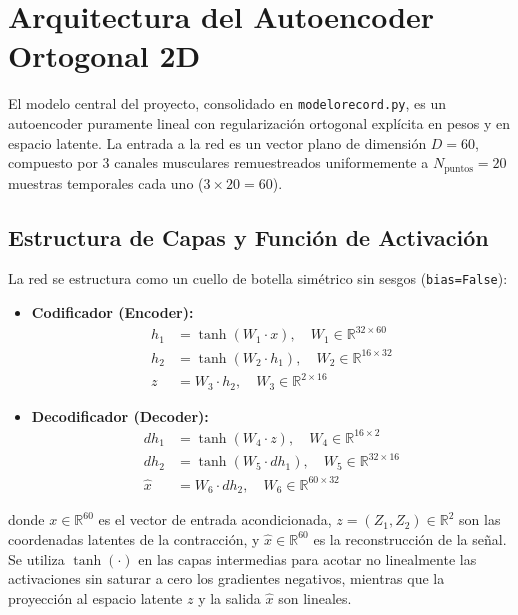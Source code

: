 \documentclass[11pt,a4paper]{article}
\begin{document}
\section{Arquitectura del Autoencoder Ortogonal 2D}
\label{sec:arquitectura_red}

El modelo central del proyecto, consolidado en \texttt{modelorecord.py}, es un autoencoder puramente lineal con regularización ortogonal explícita en pesos y en espacio latente. La entrada a la red es un vector plano de dimensión $D = 60$, compuesto por 3 canales musculares remuestreados uniformemente a $N_{\text{puntos}} = 20$ muestras temporales cada uno ($3 \times 20 = 60$).

\subsection{Estructura de Capas y Función de Activación}
\label{subsec:estructura_capas}

La red se estructura como un cuello de botella simétrico sin sesgos (\texttt{bias=False}):
\begin{itemize}
    \item \textbf{Codificador (Encoder):}
    \begin{align}
        h_1 &= \tanh(W_1 \cdot x), \quad W_1 \in \mathbb{R}^{32 \times 60} \\
        h_2 &= \tanh(W_2 \cdot h_1), \quad W_2 \in \mathbb{R}^{16 \times 32} \\
        z &= W_3 \cdot h_2, \quad W_3 \in \mathbb{R}^{2 \times 16}
    \end{align}
    \item \textbf{Decodificador (Decoder):}
    \begin{align}
        dh_1 &= \tanh(W_4 \cdot z), \quad W_4 \in \mathbb{R}^{16 \times 2} \\
        dh_2 &= \tanh(W_5 \cdot dh_1), \quad W_5 \in \mathbb{R}^{32 \times 16} \\
        \hat{x} &= W_6 \cdot dh_2, \quad W_6 \in \mathbb{R}^{60 \times 32}
    \end{align}
\end{itemize}
donde $x \in \mathbb{R}^{60}$ es el vector de entrada acondicionada, $z = (Z_1, Z_2) \in \mathbb{R}^2$ son las coordenadas latentes de la contracción, y $\hat{x} \in \mathbb{R}^{60}$ es la reconstrucción de la señal. Se utiliza $\tanh(\cdot)$ en las capas intermedias para acotar no linealmente las activaciones sin saturar a cero los gradientes negativos, mientras que la proyección al espacio latente $z$ y la salida $\hat{x}$ son lineales.
\end{document}
